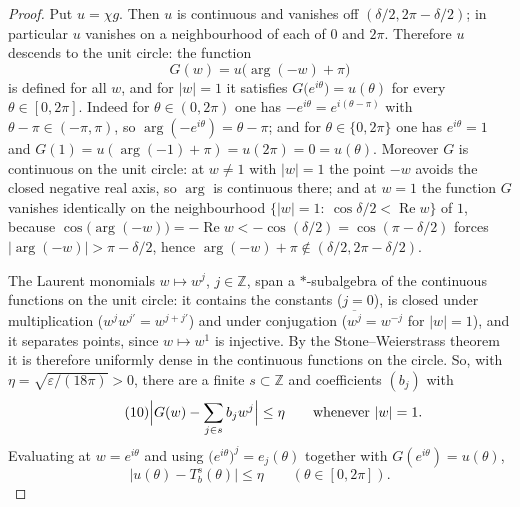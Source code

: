 \begin{proof}
Put $u=\chi g$.  Then $u$ is continuous and vanishes off
$(\delta/2,2\pi-\delta/2)$; in particular $u$ vanishes on a neighbourhood of
each of $0$ and $2\pi$.  Therefore $u$ descends to the unit circle: the
function
\[
  G(w)=u\bigl(\arg(-w)+\pi\bigr)
\]
is defined for all $w$, and for $|w|=1$ it satisfies
$G\bigl(e^{i\theta}\bigr)=u(\theta)$ for every $\theta\in[0,2\pi]$.  Indeed for
$\theta\in(0,2\pi)$ one has $-e^{i\theta}=e^{i(\theta-\pi)}$ with
$\theta-\pi\in(-\pi,\pi)$, so $\arg(-e^{i\theta})=\theta-\pi$; and for
$\theta\in\{0,2\pi\}$ one has $e^{i\theta}=1$ and
$G(1)=u(\arg(-1)+\pi)=u(2\pi)=0=u(\theta)$.  Moreover $G$ is continuous on the
unit circle: at $w\neq1$ with $|w|=1$ the point $-w$ avoids the closed
negative real axis, so $\arg$ is continuous there; and at $w=1$ the function
$G$ vanishes identically on the neighbourhood $\{|w|=1:\ \cos\delta/2<\operatorname{Re}w\}$
of $1$, because $\cos\bigl(\arg(-w)\bigr)=-\operatorname{Re}w<-\cos(\delta/2)
=\cos(\pi-\delta/2)$ forces $|\arg(-w)|>\pi-\delta/2$, hence
$\arg(-w)+\pi\notin(\delta/2,2\pi-\delta/2)$.

The Laurent monomials $w\mapsto w^j$, $j\in\mathbb{Z}$, span a
$*$-subalgebra of the continuous functions on the unit circle: it contains the
constants ($j=0$), is closed under multiplication ($w^jw^{j'}=w^{j+j'}$) and
under conjugation ($\overline{w^j}=w^{-j}$ for $|w|=1$), and it separates
points, since $w\mapsto w^1$ is injective.  By the Stone--Weierstrass theorem
it is therefore uniformly dense in the continuous functions on the circle.  So,
with $\eta=\sqrt{\varepsilon/(18\pi)}>0$, there are a finite
$s\subset\mathbb{Z}$ and coefficients $(b_j)$ with
\begin{equation}\tag{10}
  \Bigl|G(w)-\sum_{j\in s}b_jw^j\Bigr|\le\eta\qquad\text{whenever }|w|=1 .
\end{equation}
Evaluating at $w=e^{i\theta}$ and using $\bigl(e^{i\theta}\bigr)^j=e_j(\theta)$
together with $G(e^{i\theta})=u(\theta)$,
\begin{equation}\tag{11}
  \bigl|u(\theta)-T_b^s(\theta)\bigr|\le\eta\qquad(\theta\in[0,2\pi]).
\end{equation}


\end{proof}
